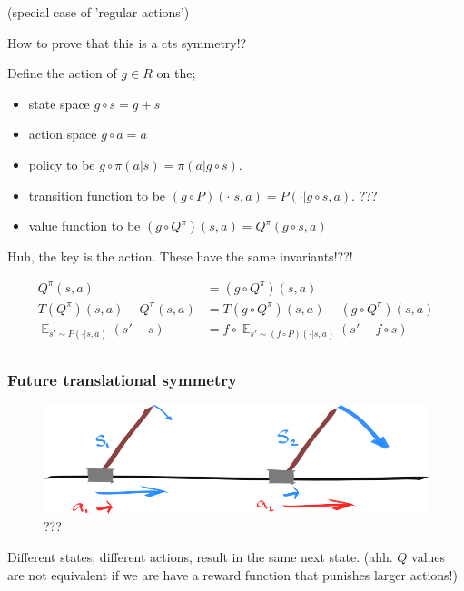 (special case of 'regular actions')

How to prove that this is a cts symmetry!?

Define the action of $g \in R$ on the;

\begin{itemize}
	\tightlist
	\item state space $g \circ s = g+s$
	\item action space $g \circ a = a$
 	\item policy to be $g \circ \pi(a | s) = \pi(a | g \circ s)$.
	\item transition function to be $(g \circ P)(\cdot | s, a) = P(\cdot| g \circ  s,  a)$. ???
	\item value function to be $(g \circ  Q^{\pi})(s, a) = Q^\pi(g \circ  s,  a)$
\end{itemize}

{\color{red}Huh, the key is the action. These have the same invariants!??!}

\begin{align}
Q^\pi(s, a) &= (g \circ Q^{\pi})(s, a) \tag{expected return}\\
T(Q^\pi)(s,a) - Q^\pi(s,a) &=T(g \circ Q^\pi)(s, a) - (g \circ Q^\pi)(s,a) \tag{Bellman residual}\\
\mathop{\mathbb E}_{s' \sim P(\cdot| s, a)} (s' - s) &= f \circ \mathop{\mathbb E}_{s' \sim (f \circ P)(\cdot| s, a)} (s' - f \circ s) \tag{change in state}\\
\end{align}

\subsubsection{Future translational symmetry}

\begin{figure}[!h]
\centering
\includegraphics[width=1\textwidth,height=0.25\textheight]{../../pictures/drawings/cart-pole-state.png}
\caption{???}
\end{figure}

Different states, different actions, result in the same next state.
(ahh. $Q$ values are not equivalent if we are have a reward function that punishes larger actions!)

